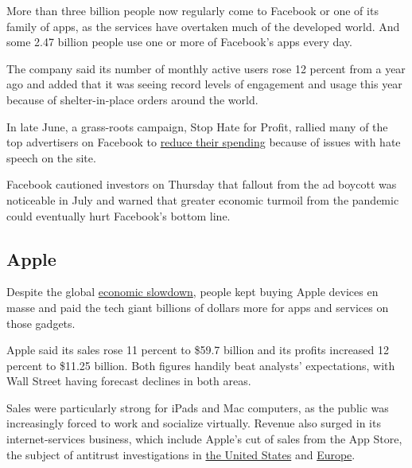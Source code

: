 More than three billion people now regularly come to Facebook or one of
its family of apps, as the services have overtaken much of the developed
world. And some 2.47 billion people use one or more of Facebook's apps
every day.

The company said its number of monthly active users rose 12 percent from
a year ago and added that it was seeing record levels of engagement and
usage this year because of shelter-in-place orders around the world.

In late June, a grass-roots campaign, Stop Hate for Profit, rallied many
of the top advertisers on Facebook to
\href{https://slack-redir.net/link?url=https\%3A\%2F\%2Fwww.nytimes3xbfgragh.onion\%2F2020\%2F06\%2F30\%2Ftechnology\%2Ffacebook-advertising-boycott.html}{reduce
their spending} because of issues with hate speech on the site.

Facebook cautioned investors on Thursday that fallout from the ad
boycott was noticeable in July and warned that greater economic turmoil
from the pandemic could eventually hurt Facebook's bottom line.

\hypertarget{apple}{%
\subsection{Apple}\label{apple}}

Despite the global
\href{https://slack-redir.net/link?url=https\%3A\%2F\%2Fwww.nytimes3xbfgragh.onion\%2Flive\%2F2020\%2F07\%2F30\%2Fbusiness\%2Fstock-market-today-coronavirus\%2Fthe-us-economys-contraction-in-the-second-quarter-was-the-worst-on-record}{economic
slowdown}, people kept buying Apple devices en masse and paid the tech
giant billions of dollars more for apps and services on those gadgets.

Apple said its sales rose 11 percent to \$59.7 billion and its profits
increased 12 percent to \$11.25 billion. Both figures handily beat
analysts' expectations, with Wall Street having forecast declines in
both areas.

Sales were particularly strong for iPads and Mac computers, as the
public was increasingly forced to work and socialize virtually. Revenue
also surged in its internet-services business, which include Apple's cut
of sales from the App Store, the subject of antitrust investigations in
\href{https://slack-redir.net/link?url=https\%3A\%2F\%2Fwww.nytimes3xbfgragh.onion\%2F2020\%2F07\%2F28\%2Ftechnology\%2Famazon-apple-facebook-google-antitrust-hearing.html}{the
United States} and
\href{https://slack-redir.net/link?url=https\%3A\%2F\%2Fwww.nytimes3xbfgragh.onion\%2F2020\%2F06\%2F16\%2Fbusiness\%2Fapple-app-store-european-union-antitrust.html}{Europe}.


